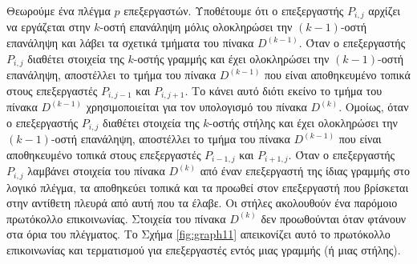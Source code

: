 \documentclass[12pt,a4paper]{article}
\begin{document}
Θεωρούμε ένα πλέγμα $p$ επεξεργαστών. Υποθέτουμε ότι ο επεξεργαστής $P_{i,j}$ αρχίζει να εργάζεται στην $k$-οστή επανάληψη μόλις ολοκληρώσει την $(k-1)$-οστή επανάληψη και λάβει τα σχετικά τμήματα του πίνακα $D^{(k-1)}$. Όταν ο επεξεργαστής $P_{i,j}$ διαθέτει στοιχεία της $k$-οστής γραμμής και έχει ολοκληρώσει την $(k-1)$-οστή επανάληψη, αποστέλλει το τμήμα του πίνακα $D^{(k-1)}$ που είναι αποθηκευμένο τοπικά στους επεξεργαστές $P_{i,j-1}$ και $P_{i,j+1}$. Το κάνει αυτό διότι εκείνο το τμήμα του πίνακα $D^{(k-1)}$ χρησιμοποιείται για τον υπολογισμό του πίνακα $D^{(k)}$. Ομοίως, όταν ο επεξεργαστής $P_{i,j}$ διαθέτει στοιχεία της $k$-οστής στήλης και έχει ολοκληρώσει την $(k-1)$-οστή επανάληψη, αποστέλλει το τμήμα του πίνακα $D^{(k-1)}$ που είναι αποθηκευμένο τοπικά στους επεξεργαστές $P_{i-1,j}$ και $P_{i+1,j}$. Όταν ο επεξεργαστής $P_{i,j}$ λαμβάνει στοιχεία του πίνακα $D^{(k)}$ από έναν επεξεργαστή της ίδιας γραμμής στο λογικό πλέγμα, τα αποθηκεύει τοπικά και τα προωθεί στον επεξεργαστή που βρίσκεται στην αντίθετη πλευρά από αυτή που τα έλαβε. Οι στήλες ακολουθούν ένα παρόμοιο πρωτόκολλο επικοινωνίας. Στοιχεία του πίνακα $D^{(k)}$ δεν προωθούνται όταν φτάνουν στα όρια του πλέγματος. Το Σχήμα \ref{fig:graph11} απεικονίζει αυτό το πρωτόκολλο επικοινωνίας και τερματισμού για επεξεργαστές εντός μιας γραμμής (ή μιας στήλης).
\end{document}
